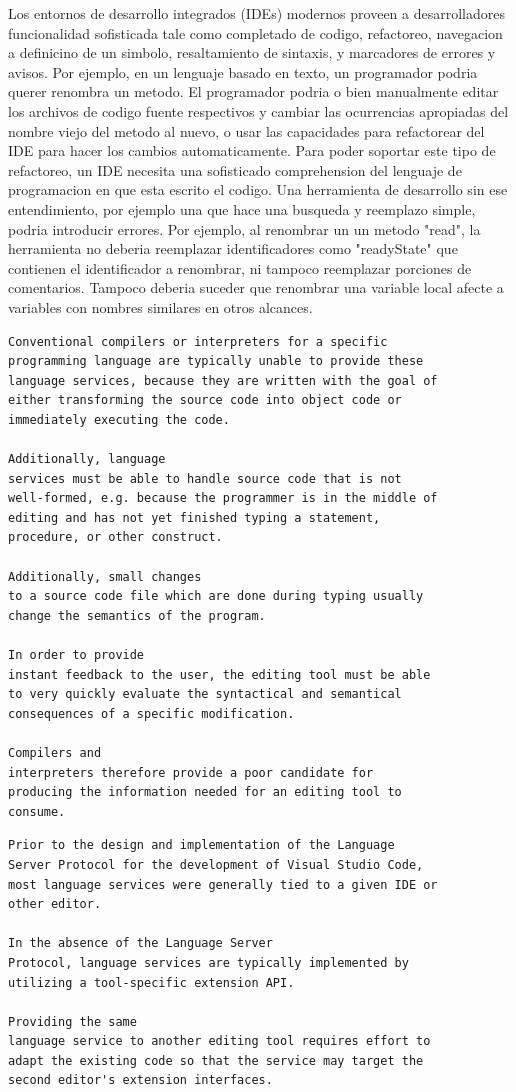 \documentclass[12pt, a4paper]{report}
\begin{document}
Los entornos de desarrollo integrados (IDEs) modernos proveen a desarrolladores funcionalidad sofisticada tale como completado de codigo, refactoreo, navegacion a definicino de un simbolo, resaltamiento de sintaxis, y marcadores de errores y avisos.
Por ejemplo, en un lenguaje basado en texto, un programador podria querer renombra un metodo.
El programador podria o bien manualmente editar los archivos de codigo fuente respectivos y cambiar las ocurrencias apropiadas del nombre viejo del metodo al nuevo, o usar las capacidades para refactorear del IDE para hacer los cambios automaticamente.
Para poder soportar este tipo de refactoreo, un IDE necesita una sofisticado comprehension del lenguaje de programacion en que esta escrito el codigo.
Una herramienta de desarrollo sin ese entendimiento, por ejemplo una que hace una busqueda y reemplazo simple, podria introducir errores.
Por ejemplo, al renombrar un un metodo "read", la herramienta no deberia reemplazar identificadores como "readyState" que contienen el identificador a renombrar, ni tampoco reemplazar porciones de comentarios. Tampoco deberia suceder que renombrar una variable local afecte a variables con nombres similares en otros alcances.
\cite{language_server_protocol_wiki}

\begin{verbatim}
Conventional compilers or interpreters for a specific
programming language are typically unable to provide these
language services, because they are written with the goal of
either transforming the source code into object code or
immediately executing the code.

Additionally, language
services must be able to handle source code that is not
well-formed, e.g. because the programmer is in the middle of
editing and has not yet finished typing a statement,
procedure, or other construct.

Additionally, small changes
to a source code file which are done during typing usually
change the semantics of the program.

In order to provide
instant feedback to the user, the editing tool must be able
to very quickly evaluate the syntactical and semantical
consequences of a specific modification.

Compilers and
interpreters therefore provide a poor candidate for
producing the information needed for an editing tool to
consume.
\end{verbatim}
\cite{language_server_protocol_wiki}

\begin{verbatim}
Prior to the design and implementation of the Language
Server Protocol for the development of Visual Studio Code,
most language services were generally tied to a given IDE or
other editor.

In the absence of the Language Server
Protocol, language services are typically implemented by
utilizing a tool-specific extension API.

Providing the same
language service to another editing tool requires effort to
adapt the existing code so that the service may target the
second editor's extension interfaces.
\end{verbatim}
\cite{language_server_protocol_wiki}
\end{document}
